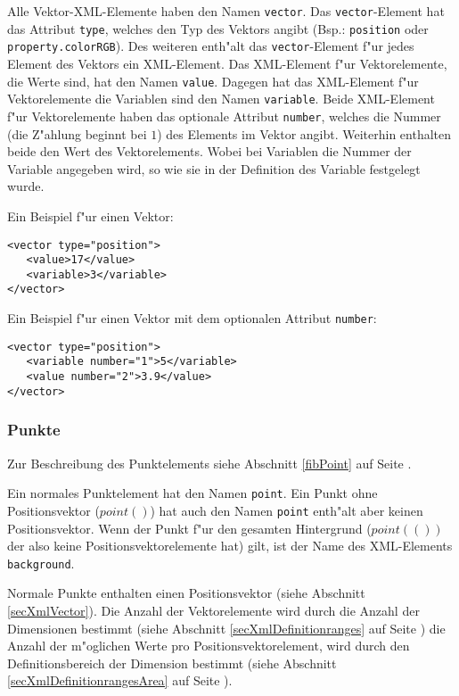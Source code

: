 Alle Vektor-XML-Elemente haben den Namen \verb|vector|. Das \verb|vector|-Element hat das Attribut \verb|type|, welches den Typ des Vektors angibt (Bsp.: \verb|position| oder \verb|property.colorRGB|). Des weiteren enth"alt das \verb|vector|-Element f"ur jedes Element des Vektors ein XML-Element. Das XML-Element f"ur Vektorelemente, die Werte sind, hat den Namen \verb|value|. Dagegen hat das XML-Element f"ur Vektorelemente die Variablen sind den Namen \verb|variable|.
Beide XML-Element f"ur Vektorelemente haben das optionale Attribut \verb|number|, welches die Nummer (die Z"ahlung beginnt bei $1$) des Elements im Vektor angibt. Weiterhin enthalten beide den Wert des Vektorelements. Wobei bei Variablen die Nummer der Variable angegeben wird, so wie sie in der Definition des Variable festgelegt wurde.

\bigskip\noindent
Ein Beispiel f"ur einen Vektor:
\begin{verbatim}
<vector type="position">
   <value>17</value>
   <variable>3</variable>
</vector>
\end{verbatim}

Ein Beispiel f"ur einen Vektor mit dem optionalen Attribut \verb|number|:
\begin{verbatim}
<vector type="position">
   <variable number="1">5</variable>
   <value number="2">3.9</value>
</vector>
\end{verbatim}



\subsubsection{Punkte}

Zur Beschreibung des Punktelements siehe Abschnitt \ref{fibPoint} auf Seite \pageref{fibPoint} .

Ein normales Punktelement hat den Namen \verb|point|. Ein Punkt ohne Positionsvektor ($point()$) hat auch den Namen \verb|point| enth"alt aber keinen Positionsvektor.
Wenn der Punkt f"ur den gesamten Hintergrund ($point(())$ der also keine Positionsvektorelemente hat) gilt, ist der Name des XML-Elements \verb|background|.

Normale Punkte enthalten einen Positionsvektor (siehe Abschnitt \ref{secXmlVector}). Die Anzahl der Vektorelemente wird durch die Anzahl der Dimensionen bestimmt (siehe Abschnitt \ref{secXmlDefinitionranges} auf Seite \pageref{secXmlDefinitionranges}) die Anzahl der m"oglichen Werte pro Positionsvektorelement, wird durch den Definitionsbereich der Dimension bestimmt (siehe Abschnitt \ref{secXmlDefinitionrangesArea} auf Seite \pageref{secXmlDefinitionrangesArea}).

